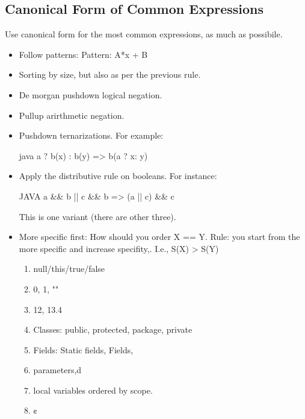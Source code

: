 \subsection{Canonical Form of Common Expressions}
Use canonical form for the most common expressions, as much as possibile.
\begin{itemize}
  \item Follow patterns: Pattern: A*x + B
  \item Sorting by size, but also as per the previous rule.
  \item De morgan pushdown logical negation.
  \item Pullup arirthmetic negation.
  \item Pushdown ternarizations. For example:
  \begin{code}{java}
a ? b(x) : b(y) => b(a ? x: y)
  \end{code}
  \item Apply the distributive rule on booleans. For instance:
    \begin{code}{JAVA}
a && b || c && b => (a || c) && c
    \end{code}
      This is one variant (there are other three).
  \item More specific first: How should you order X == Y.
        Rule: you start from the more specific and increase specifity,.
        I.e., S(X) > S(Y)
        \begin{enumerate}
          \item null/this/true/false
          \item 0, 1, ""
          \item 12, 13.4
          \item Classes: public, protected, package, private
          \item Fields: Static fields, Fields,
          \item parameters,d
          \item local variables ordered by scope.
          \item ¢
        \end{enumerate}
\end{itemize}

